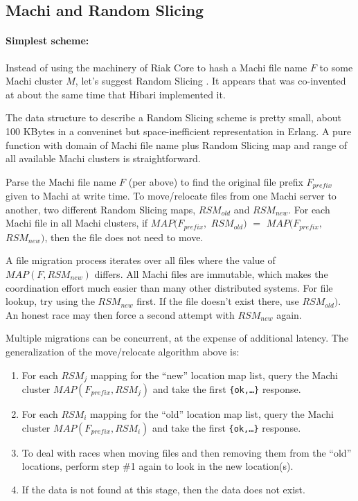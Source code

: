 \documentclass[preprint,10pt]{sigplanconf}
\begin{document}
\subsection{Machi and Random Slicing}
\label{sub:integration-random-slicing}

\paragraph{Simplest scheme:}
Instead of using the machinery of Riak Core to hash a Machi file name
$F$ to some Machi cluster $M$, let's suggest Random Slicing
\cite{random-slicing}.  It appears that \cite{random-slicing} was
co-invented at about the same time that Hibari
\cite{cr-theory-and-practice} implemented it.

The data structure to describe a Random Slicing scheme is pretty
small, about 100 KBytes in a conveninet but space-inefficient
representation in Erlang.  A pure function with domain of Machi file
name plus Random Slicing map and range of all available Machi clusters
is straightforward.

Parse the Machi file name $F$ (per above) to find the original
file prefix $F_{prefix}$ given to Machi at write time.
To move/relocate files from one Machi server to another, two different
Random Slicing maps, $RSM_{old}$ and $RSM_{new}$.  For each Machi file
in all Machi clusters, if
$MAP(F_{prefix},$ $RSM_{old})$ $=$ $MAP(F_{prefix},$ $RSM_{new})$,
then the file does not need to move.

A file migration process iterates over all files where the value of
$MAP(F, RSM_{new})$ differs.  All Machi files are immutable, which
makes the coordination effort much easier than many other distributed
systems.  For file lookup, try using the $RSM_{new}$ first.  If the
file doesn't exist there, use $RSM_{old})$.  An honest race may
then force a second attempt with $RSM_{new}$ again.

Multiple migrations can be concurrent, at the expense of additional
latency.  The generalization of the move/relocate algorithm above is:

\begin{enumerate}
\item For each $RSM_j$ mapping for the ``new'' location map list,
  query the Machi cluster $MAP(F_{prefix}, RSM_j)$ and take the
  first {\tt \{ok,\ldots\}} response.
\item For each $RSM_i$ mapping for the ``old'' location map list,
  query the Machi cluster $MAP(F_{prefix}, RSM_i)$ and take the
  first {\tt \{ok,\ldots\}} response.
\item To deal with races when moving files and then removing them from
  the ``old'' locations, perform step \#1 again to look in the new
  location(s).
\item If the data is not found at this stage, then the data does not exist.
\end{enumerate}
\end{document}
